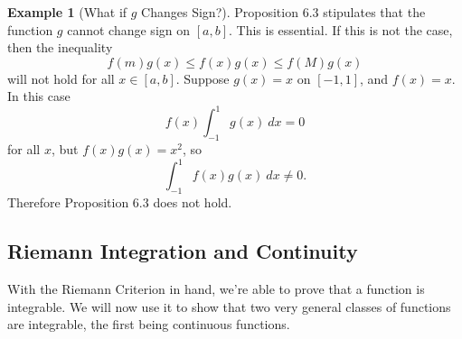 \documentclass{article}
\theoremstyle{definition}
\newtheorem{example}{Example}[section]
\begin{document}
	\begin{example}[What if $ g $ Changes Sign?]
		Proposition 6.3 stipulates that the function $ g $ cannot change sign on $ [a,b] $. This is essential. If this is not the case, then the inequality  
		$$f(m)g(x)\le f(x)g(x)\le f(M)g(x)$$ will not hold for all $ x\in [a,b] $. Suppose $ g(x)=x $ on $ [-1,1] $, and $ f(x)=x $. In this case $$f(x)\int_{-1}^{1}g(x)\ dx=0 $$ for all $ x $, but $ f(x)g(x)=x^2 $, so $$ \int_{-1}^{1}f(x)g(x)\ dx\neq 0 .$$ Therefore Proposition 6.3 does not hold. 
	\end{example}
	\subsection{Riemann Integration and Continuity}
	With the Riemann Criterion in hand, we're able to prove that a function is integrable. We will now use it to show that two very general classes of functions are integrable, the first being continuous functions.
	
\end{document}
